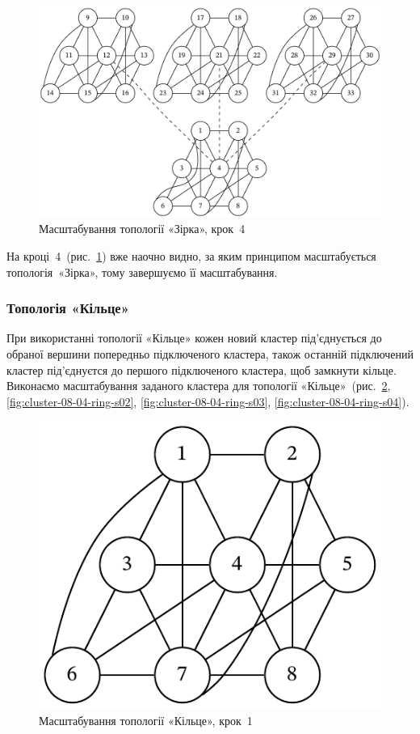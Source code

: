 \documentclass[
	a4paper,
	oneside,
	BCOR = 10mm,
	DIV = 12,
	12pt,
	headings = normal,
]{scrartcl}
\begin{document}
				\begin{figure}[!htbp]
					\centering
					\includegraphics[height=12\baselineskip]{./assets/cluster-08-03-star-s04.pdf}
					\caption{Масштабування топології «Зірка», крок~4}
					\label{fig:cluster-08-03-star-s04}
				\end{figure}

				На кроці~4~(рис.~\ref{fig:cluster-08-03-star-s04}) вже наочно видно, за яким принципом масштабується топологія~«Зірка», тому завершуємо її масштабування.

			\subsubsection{Топологія «Кільце»}
				При використанні топології «Кільце» кожен новий кластер під'єднується до обраної вершини попередньо підключеного кластера, також останній підключений кластер під'єднуєтся до першого підключеного кластера, щоб замкнути кільце. Виконаємо масштабування заданого кластера для топології «Кільце»~(рис.~\ref{fig:cluster-08-04-ring-s01}, \ref{fig:cluster-08-04-ring-s02}, \ref{fig:cluster-08-04-ring-s03}, \ref{fig:cluster-08-04-ring-s04}).

				\begin{figure}[!htbp]
					\centering
					\includegraphics[height=6\baselineskip]{./assets/cluster-08-01-named.pdf}
					\caption{Масштабування топології «Кільце», крок~1}
					\label{fig:cluster-08-04-ring-s01}
				\end{figure}
\end{document}
